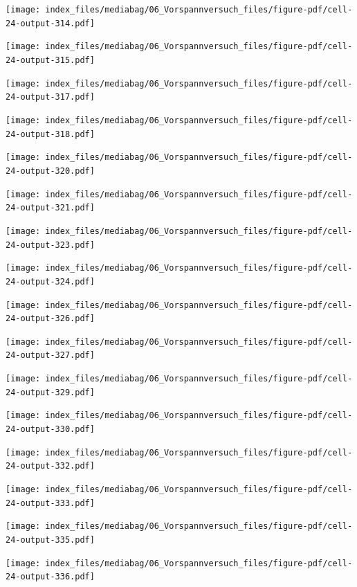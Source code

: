 \documentclass[
  11pt,
  letterpaper,
]{scrreprt}
\begin{document}
\newpage{}

\texttt{[image: index\_files/mediabag/06\_Vorspannversuch\_files/figure-pdf/cell-24-output-314.pdf]}

\texttt{[image: index\_files/mediabag/06\_Vorspannversuch\_files/figure-pdf/cell-24-output-315.pdf]}

\newpage{}

\texttt{[image: index\_files/mediabag/06\_Vorspannversuch\_files/figure-pdf/cell-24-output-317.pdf]}

\texttt{[image: index\_files/mediabag/06\_Vorspannversuch\_files/figure-pdf/cell-24-output-318.pdf]}

\newpage{}

\texttt{[image: index\_files/mediabag/06\_Vorspannversuch\_files/figure-pdf/cell-24-output-320.pdf]}

\texttt{[image: index\_files/mediabag/06\_Vorspannversuch\_files/figure-pdf/cell-24-output-321.pdf]}

\newpage{}

\texttt{[image: index\_files/mediabag/06\_Vorspannversuch\_files/figure-pdf/cell-24-output-323.pdf]}

\texttt{[image: index\_files/mediabag/06\_Vorspannversuch\_files/figure-pdf/cell-24-output-324.pdf]}

\newpage{}

\texttt{[image: index\_files/mediabag/06\_Vorspannversuch\_files/figure-pdf/cell-24-output-326.pdf]}

\texttt{[image: index\_files/mediabag/06\_Vorspannversuch\_files/figure-pdf/cell-24-output-327.pdf]}

\newpage{}

\texttt{[image: index\_files/mediabag/06\_Vorspannversuch\_files/figure-pdf/cell-24-output-329.pdf]}

\texttt{[image: index\_files/mediabag/06\_Vorspannversuch\_files/figure-pdf/cell-24-output-330.pdf]}

\newpage{}

\texttt{[image: index\_files/mediabag/06\_Vorspannversuch\_files/figure-pdf/cell-24-output-332.pdf]}

\texttt{[image: index\_files/mediabag/06\_Vorspannversuch\_files/figure-pdf/cell-24-output-333.pdf]}

\newpage{}

\texttt{[image: index\_files/mediabag/06\_Vorspannversuch\_files/figure-pdf/cell-24-output-335.pdf]}

\texttt{[image: index\_files/mediabag/06\_Vorspannversuch\_files/figure-pdf/cell-24-output-336.pdf]}
\end{document}
